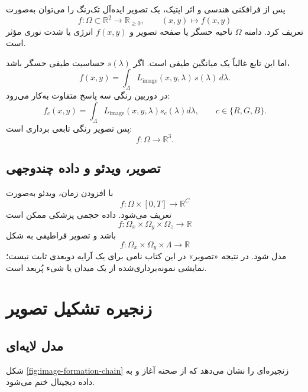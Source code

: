 \documentclass[12pt,openany,oneside]{book}
\newcommand{\R}{\mathbb{R}}
\begin{document}
پس از فرافکنی هندسی و اثر اپتیک، یک تصویر ایده‌آل تک‌رنگ را می‌توان به‌صورت
\begin{equation}
f:\Omega\subset\R^2\longrightarrow \R_{\ge 0},
\qquad (x,y)\longmapsto f(x,y)
\end{equation}
تعریف کرد. دامنه \(\Omega\) ناحیه حسگر یا صفحه تصویر و \(f(x,y)\) انرژی یا شدت نوری مؤثر است.

اما این تابع غالباً یک میانگین طیفی است. اگر \(s(\lambda)\) حساسیت طیفی حسگر باشد،
\begin{equation}
f(x,y)=\int_{\Lambda} L_{\mathrm{image}}(x,y,\lambda)\,s(\lambda)\,d\lambda.
\label{eq:spectral-integration}
\end{equation}
در دوربین رنگی سه پاسخ متفاوت به‌کار می‌رود:
\begin{equation}
f_c(x,y)=\int_{\Lambda}L_{\mathrm{image}}(x,y,\lambda)s_c(\lambda)d\lambda,
\qquad c\in\{R,G,B\}.
\end{equation}
پس تصویر رنگی تابعی برداری است:
\begin{equation}
f:\Omega\to\R^3.
\end{equation}

\subsection{تصویر، ویدئو و داده چندوجهی}

با افزودن زمان، ویدئو به‌صورت
\begin{equation}
f:\Omega\times[0,T]\to\R^C
\end{equation}
تعریف می‌شود. داده حجمی پزشکی ممکن است
\begin{equation}
f:\Omega_x\times\Omega_y\times\Omega_z\to\R
\end{equation}
باشد و تصویر فراطیفی به شکل
\begin{equation}
f:\Omega_x\times\Omega_y\times\Lambda\to\R
\end{equation}
مدل شود. در نتیجه «تصویر» در این کتاب نامی برای یک آرایه دوبعدی ثابت نیست؛
نمایشی نمونه‌برداری‌شده از یک میدان یا شیء پُربعد است.

\section{زنجیره تشکیل تصویر}

\subsection{مدل لایه‌ای}

شکل \ref{fig:image-formation-chain} زنجیره‌ای را نشان می‌دهد که از صحنه آغاز و به داده دیجیتال ختم می‌شود.
\end{document}
